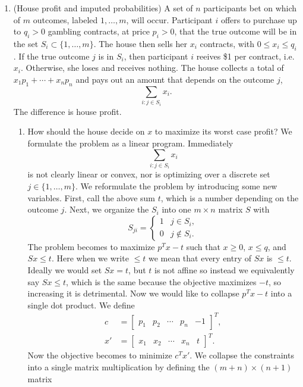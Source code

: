 \documentclass{article}
\begin{document}
\begin{enumerate}
\item (House profit and imputed probabilities) A set of $n$ participants bet on which of $m$ outcomes, labeled $1, \dots, m$, will occur. Participant $i$ offers to purchase up to $q_i > 0$ gambling contracts, at price $p_i > 0$, that the true outcome will be in the set $S_i \subset \{1, \dots, m\}$. The house then sells her $x_i$ contracts, with $0 \leq x_i \leq q_i$. If the true outcome $j$ is in $S_i$, then participant $i$ reeives \$1 per contract, i.e. $x_i$. Otherwise, she loses and receives nothing. The house collects a total of $x_1p_1 + \cdots + x_np_n$ and pays out an amount that depends on the outcome $j$, \[
        \sum_{i : j \in S_i} x_i.
    \] The difference is house profit.
    \begin{enumerate}
        \item How should the house decide on $x$ to maximize its worst case profit? We formulate the problem as a linear program. Immediately \[
            \sum_{i : j \in S_i} x_i
        \] is not clearly linear or convex, nor is optimizing over a discrete set $j \in \{1, \dots, m\}$. We reformulate the problem by introducing some new variables. First, call the above sum $t$, which is a number depending on the outcome $j$. Next, we organize the $S_i$ into one $m \times n$ matrix $S$ with \[
            S_{ji} = \begin{cases}
                1 & j \in S_i, \\
                0 & j \notin S_i.
            \end{cases}
        \] The problem becomes to maximize $p^T x - t$ such that $x \geq 0$, $x \leq q$, and $Sx \leq t$. Here when we write $\leq t$ we mean that every entry of $Sx$ is $\leq t$. Ideally we would set $Sx = t$, but $t$ is not affine so instead we equivalently say $Sx \leq t$, which is the same because the objective maximizes $-t$, so increasing it is detrimental. Now we would like to collapse $p^T x - t$ into a single dot product. We define \begin{align*}
            c &= \begin{bmatrix}
                p_1 & p_2 & \cdots & p_n & -1
            \end{bmatrix}^T, \\
            x' &= \begin{bmatrix}
                x_1 & x_2 & \cdots & x_n & t
            \end{bmatrix}^T.
        \end{align*} Now the objective becomes to minimize $c^T x'$. We collapse the constraints into a single matrix multiplication by defining the $(m + n) \times (n + 1)$ matrix \[
\]
\end{enumerate}
\end{enumerate}
\end{document}
